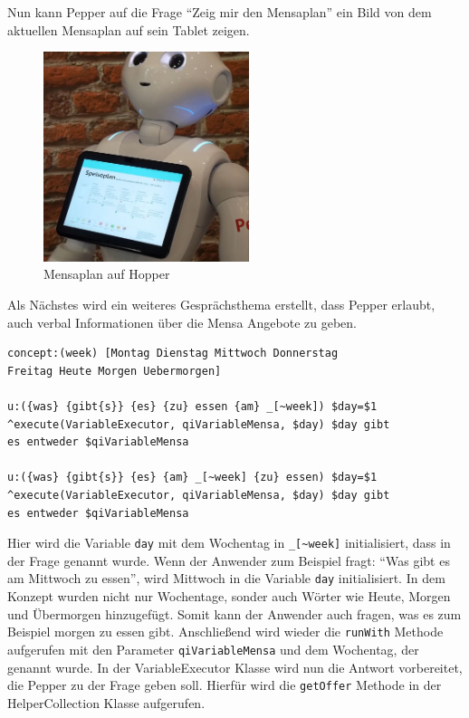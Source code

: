Nun kann Pepper auf die Frage ``Zeig mir den Mensaplan'' ein Bild von dem aktuellen Mensaplan auf sein Tablet zeigen. \\

\begin{figure}[H]
    \centering
    \includegraphics[width=6cm]{Figures/AppChapter/rx2.JPG}
    \caption{Mensaplan auf Hopper}
    \label{fig:mensaplanPepper}
    \centering
\end{figure}

Als Nächstes wird ein weiteres Gesprächsthema erstellt, dass Pepper erlaubt, auch verbal Informationen über die Mensa Angebote zu geben.\\

\begin{lstlisting}
concept:(week) [Montag Dienstag Mittwoch Donnerstag 
Freitag Heute Morgen Uebermorgen]

u:({was} {gibt{s}} {es} {zu} essen {am} _[~week]) $day=$1 
^execute(VariableExecutor, qiVariableMensa, $day) $day gibt 
es entweder $qiVariableMensa

u:({was} {gibt{s}} {es} {am} _[~week] {zu} essen) $day=$1 
^execute(VariableExecutor, qiVariableMensa, $day) $day gibt 
es entweder $qiVariableMensa
\end{lstlisting}

Hier wird die Variable \verb|day| mit dem Wochentag in  \verb|_[~week]| initialisiert, dass in der Frage genannt wurde. Wenn der Anwender 
zum Beispiel fragt: ``Was gibt es am Mittwoch zu essen'', wird Mittwoch in die Variable \verb|day| initialisiert. In dem Konzept 
wurden nicht nur Wochentage, sonder auch Wörter wie Heute, Morgen und Übermorgen hinzugefügt. Somit kann der Anwender auch fragen, was es zum Beispiel 
morgen zu essen gibt. 
Anschließend wird wieder die \verb|runWith| Methode aufgerufen mit den Parameter \verb|qiVariableMensa| und dem Wochentag, der genannt wurde.
In der VariableExecutor Klasse wird nun die Antwort vorbereitet, die Pepper zu der Frage geben soll. Hierfür wird die \verb|getOffer| Methode in 
der HelperCollection Klasse aufgerufen.\\

